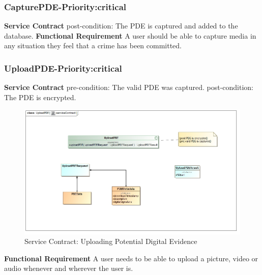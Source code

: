 \documentclass[a4paper,12pt]{article}
\begin{document}
\subsubsection{CapturePDE-Priority:critical}
\textbf{Service Contract}\newline
post-condition: The PDE is captured and added to the database.\newline
\textbf{Functional Requirement}\newline
A user should be able to capture media in any situation they feel that a crime has been committed.	\newline
\subsubsection{UploadPDE-Priority:critical}
\textbf{Service Contract}\newline
pre-condition: The valid PDE was captured.\newline
post-condition: The PDE is encrypted.\newline
\begin{figure}[H]
\includegraphics[width=\textwidth]{images/UploadserviceContract.jpg}
\caption{Service Contract: Uploading Potential Digital Evidence \label{overflow}}
\end{figure}\newpage
\textbf{Functional Requirement}\newline
A user needs to be able to upload a picture, video or audio whenever and wherever the user is.\newline
\end{document}
